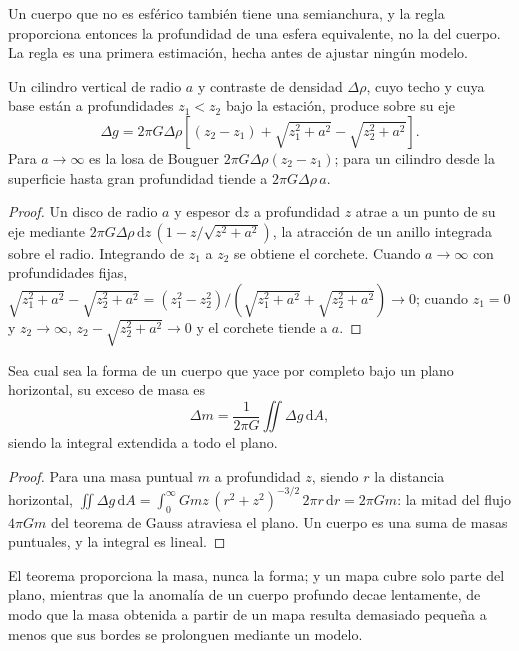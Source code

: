 Un cuerpo que no es esférico también tiene una semianchura, y la regla
proporciona entonces la profundidad de una esfera equivalente, no la del cuerpo. La regla es
una primera estimación, hecha antes de ajustar ningún modelo.

\begin{proposition}\label{prop:b3:field-lab-methods-3:vcyl}
Un cilindro vertical de radio $a$ y contraste de densidad $\Delta\rho$,
cuyo techo y cuya base están a profundidades $z_1 < z_2$ bajo la estación,
produce sobre su eje
\[
\Delta g = 2\pi G\Delta\rho\left[(z_2 - z_1) + \sqrt{z_1^2 + a^2}
           - \sqrt{z_2^2 + a^2}\right] .
\]
Para $a \to \infty$ es la losa de Bouguer $2\pi G\Delta\rho(z_2 - z_1)$;
para un cilindro desde la superficie hasta gran profundidad tiende a
$2\pi G\Delta\rho\,a$.
\end{proposition}

\begin{proof}
Un disco de radio $a$ y espesor $\mathrm{d}z$ a profundidad $z$ atrae
a un punto de su eje mediante $2\pi G\Delta\rho\,\mathrm{d}z\,(1 -
z/\sqrt{z^2 + a^2})$, la atracción de un anillo integrada sobre el
radio. Integrando de $z_1$ a $z_2$ se obtiene el corchete. Cuando $a \to
\infty$ con profundidades fijas, $\sqrt{z_1^2 + a^2} - \sqrt{z_2^2 + a^2} =
(z_1^2 - z_2^2)/(\sqrt{z_1^2 + a^2} + \sqrt{z_2^2 + a^2}) \to 0$; cuando
$z_1 = 0$ y $z_2 \to \infty$, $z_2 - \sqrt{z_2^2 + a^2} \to 0$ y
el corchete tiende a $a$.
\end{proof}

\begin{proposition}\label{prop:b3:field-lab-methods-3:gauss}
Sea cual sea la forma de un cuerpo que yace por completo bajo un
plano horizontal, su exceso de masa es
\[
\Delta m = \frac{1}{2\pi G}\iint \Delta g\,\mathrm{d}A ,
\]
siendo la integral extendida a todo el plano.
\end{proposition}

\begin{proof}
\sloppy Para una masa puntual $m$ a profundidad $z$, siendo $r$ la distancia horizontal,
$\iint \Delta g\,\mathrm{d}A = \int_0^\infty
Gmz\,(r^2 + z^2)^{-3/2}\,2\pi r\,\mathrm{d}r = 2\pi Gm$: la mitad del flujo
$4\pi Gm$ del teorema de Gauss atraviesa el plano. Un cuerpo es una suma de masas
puntuales, y la integral es lineal.
\end{proof}

El teorema proporciona la masa, nunca la forma; y un mapa cubre solo parte
del plano, mientras que la anomalía de un cuerpo profundo decae lentamente, de modo que
la masa obtenida a partir de un mapa resulta demasiado pequeña a menos que sus bordes se prolonguen
mediante un modelo.

